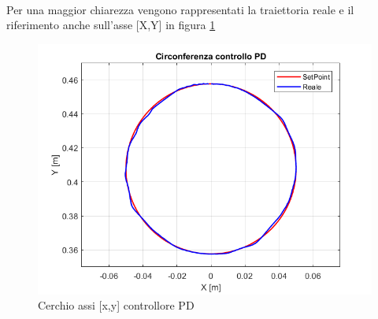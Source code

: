 \\Per una maggior chiarezza vengono rappresentati la traiettoria reale e il riferimento anche sull'asse [X,Y] in figura \ref{fig:PDBracciaC}
\begin{figure}[ht]
	\begin{center}
		\includegraphics[scale=0.42]{Immagini/Traiettorie/Cerchio}
		\caption{Cerchio assi  [x,y] controllore PD}
		\label{fig:PDBracciaC}
	\end{center}
\end{figure}
